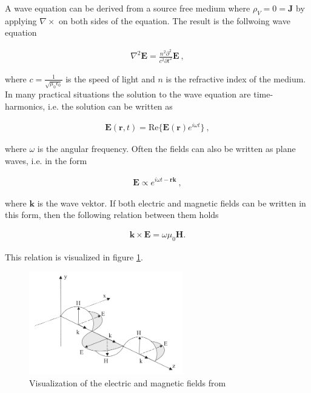 A wave equation can be derived from a source free medium where $\rho_V = 0 = \boldsymbol{J}$ by applying $\nabla \times$ on both sides of the equation. The result is the follwoing wave equation

\begin{align}
\nabla^2 \boldsymbol{E} = \frac{n^2 \partial^2}{c^2\partial t^2} \boldsymbol{E}~,
\label{eq:waveequation}
\end{align}

where $c = \frac{1}{\sqrt{\mu_0 \epsilon_0}}$ is the speed of light and $n$ is the refractive index of the medium. In many practical situations the solution to the wave equation are time-harmonics, i.e. the solution can be written as 


\begin{align}
\boldsymbol{E} (\boldsymbol{r}, t) = \text{Re}\{ \boldsymbol{E}(\boldsymbol{r}) e^{i\omega t} \} ~,
\end{align}

where $\omega$ is the angular frequency. Often the fields can also be written as plane waves, i.e. in the form

\begin{align}
\boldsymbol{E} \propto e^{i\omega t - \boldsymbol{r} \boldsymbol{k}}~,
\end{align}

where $\boldsymbol{k}$ is the wave vektor. If both electric and magnetic fields can be written in this form, then the following relation between them holds

\begin{align}
\boldsymbol{k}\times \boldsymbol{E} = \omega \mu_0 \boldsymbol{H}.
\end{align}

This relation is visualized in figure \ref{fig:EMWaves}.

\begin{figure}[h!]
    \centering
    \includegraphics[width=0.6\textwidth]{figures/EMWaves.png}
    \caption{Visualization of the electric and magnetic fields from \cite{wartak2013computational}}
    \label{fig:EMWaves}
\end{figure}


